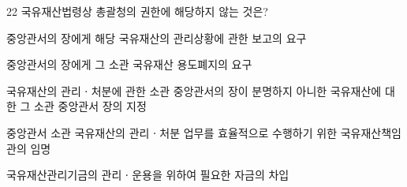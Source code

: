 \begin{question}{22}
국유재산법령상 총괄청의 권한에 해당하지 않는 것은?
\begin{choices}
  \item 중앙관서의 장에게 해당 국유재산의 관리상황에 관한 보고의 요구
  \item 중앙관서의 장에게 그 소관 국유재산 용도폐지의 요구
  \item 국유재산의 관리ㆍ처분에 관한 소관 중앙관서의 장이 분명하지 아니한 국유재산에 대한 그 소관 중앙관서 장의 지정
  \item 중앙관서 소관 국유재산의 관리ㆍ처분 업무를 효율적으로 수행하기 위한 국유재산책임관의 임명
  \item 국유재산관리기금의 관리ㆍ운용을 위하여 필요한 자금의 차입
\end{choices}
\end{question}
